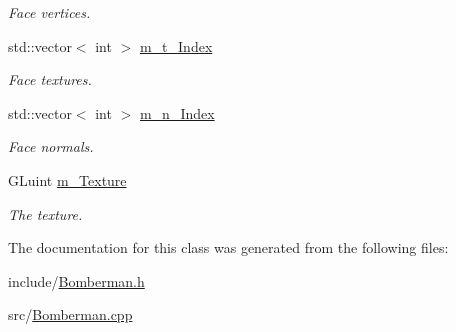 \begin{DoxyCompactItemize}
\begin{DoxyCompactList}\small\item\em Face vertices. \end{DoxyCompactList}\item 
\hypertarget{classBomberman_a370bce95e187ca416eca7740e919019d}{std\-::vector$<$ int $>$ \hyperlink{classBomberman_a370bce95e187ca416eca7740e919019d}{m\-\_\-t\-\_\-\-Index}}\label{classBomberman_a370bce95e187ca416eca7740e919019d}

\begin{DoxyCompactList}\small\item\em Face textures. \end{DoxyCompactList}\item 
\hypertarget{classBomberman_a11c4ae67fee4f821c3d28b20b90fb910}{std\-::vector$<$ int $>$ \hyperlink{classBomberman_a11c4ae67fee4f821c3d28b20b90fb910}{m\-\_\-n\-\_\-\-Index}}\label{classBomberman_a11c4ae67fee4f821c3d28b20b90fb910}

\begin{DoxyCompactList}\small\item\em Face normals. \end{DoxyCompactList}\item 
\hypertarget{classBomberman_ab3cff3f91f76bdf2eb0dfaea069846c5}{G\-Luint \hyperlink{classBomberman_ab3cff3f91f76bdf2eb0dfaea069846c5}{m\-\_\-\-Texture}}\label{classBomberman_ab3cff3f91f76bdf2eb0dfaea069846c5}

\begin{DoxyCompactList}\small\item\em The texture. \end{DoxyCompactList}\end{DoxyCompactItemize}


The documentation for this class was generated from the following files\-:\begin{DoxyCompactItemize}
\item 
include/\hyperlink{Bomberman_8h}{Bomberman.\-h}\item 
src/\hyperlink{Bomberman_8cpp}{Bomberman.\-cpp}\end{DoxyCompactItemize}
